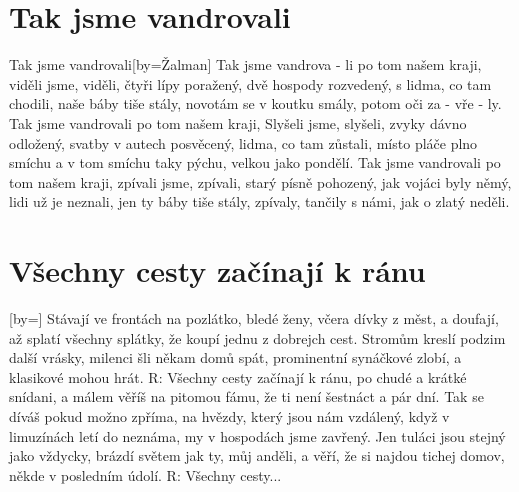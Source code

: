 \documentclass{article}
\begin{document}
\begin{songs}{}
\end{songs}

\begin{songs}{}
\section{Tak jsme vandrovali}

\begin{song}{Tak jsme vandrovali}[by={Žalman}]
\beginverse
Tak jsme vandrova - li po tom našem kraji,
viděli jsme, viděli,
čtyři lípy poražený, dvě hospody rozvedený,
s lidma, co tam chodili,
naše báby tiše stály, novotám se v koutku smály,
potom oči za - vře - ly.
\endverse
\beginverse
Tak jsme vandrovali po tom našem kraji,
Slyšeli jsme, slyšeli,
zvyky dávno odložený, svatby v autech posvěcený,
lidma, co tam zůstali,
místo pláče plno smíchu a v tom smíchu taky pýchu,
velkou jako pondělí.
\endverse
\beginverse
Tak jsme vandrovali po tom našem kraji,
zpívali jsme, zpívali,
starý písně pohozený, jak vojáci byly němý,
lidi už je neznali,
jen ty báby tiše stály, zpívaly, tančily s námi,
jak o zlatý neděli.
\endverse
\end{song}
\section{Všechny cesty začínají k ránu}

\begin{song}{}[by={}]
\beginverse
Stávají ve frontách na pozlátko,
bledé ženy, včera dívky z měst,
a doufají, až splatí všechny splátky,
že koupí jednu z dobrejch cest.
\endverse
\beginverse
Stromům kreslí podzim další vrásky,
milenci šli někam domů spát,
prominentní synáčkové zlobí,
a klasikové mohou hrát.
\endverse
\beginverse
R: Všechny cesty začínají k ránu,
po chudé a krátké snídani,
a málem věříš na pitomou fámu,
že ti není šestnáct a pár dní.
\endverse
\beginverse
Tak se díváš pokud možno zpříma,
na hvězdy, který jsou nám vzdálený,
když v limuzínách letí do neznáma,
my v hospodách jsme zavřený.
\endverse
\beginverse
Jen tuláci jsou stejný jako vždycky,
brázdí světem jak ty, můj anděli,
a věří, že si najdou tichej domov,
někde v posledním údolí.
\endverse
\beginverse
R: Všechny cesty...
\endverse
\end{song}
\section{}


\end{songs}
\end{document}
